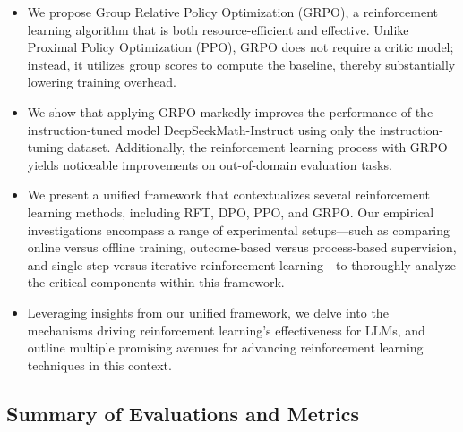 \begin{itemize}[topsep=0pt]
    \item We propose Group Relative Policy Optimization (GRPO), a reinforcement learning algorithm that is both resource-efficient and effective. Unlike Proximal Policy Optimization (PPO), GRPO does not require a critic model; instead, it utilizes group scores to compute the baseline, thereby substantially lowering training overhead.
    \item We show that applying GRPO markedly improves the performance of the instruction-tuned model DeepSeekMath-Instruct using only the instruction-tuning dataset. Additionally, the reinforcement learning process with GRPO yields noticeable improvements on out-of-domain evaluation tasks.
    \item We present a unified framework that contextualizes several reinforcement learning methods, including RFT, DPO, PPO, and GRPO. Our empirical investigations encompass a range of experimental setups—such as comparing online versus offline training, outcome-based versus process-based supervision, and single-step versus iterative reinforcement learning—to thoroughly analyze the critical components within this framework.
    \item Leveraging insights from our unified framework, we delve into the mechanisms driving reinforcement learning’s effectiveness for LLMs, and outline multiple promising avenues for advancing reinforcement learning techniques in this context.
\end{itemize}

\subsection{Summary of Evaluations and Metrics}

